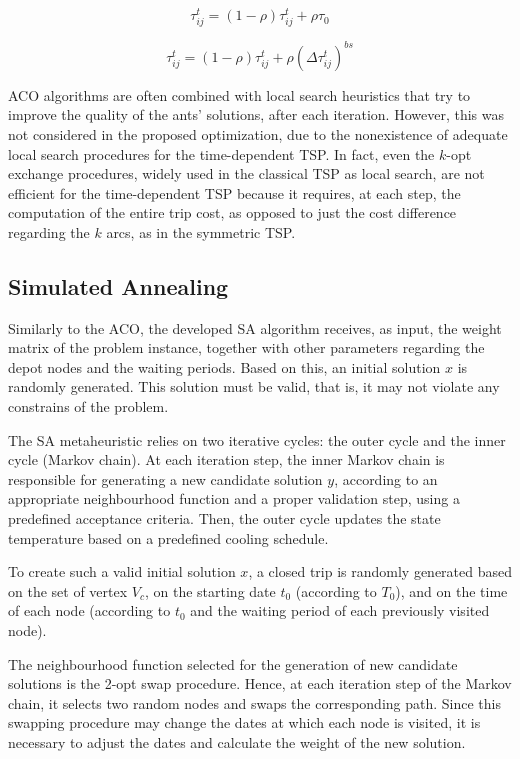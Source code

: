 \documentclass[onecolumn]{elsarticle}
\begin{document}
\begin{equation}
\label{eq:local_update}
    \tau_{ij}^{t} = (1-\rho)\tau_{ij}^{t} + \rho \tau_{0}
\end{equation}

\begin{equation}
\label{eq:pheromone_update}
    \tau_{ij}^{t} = (1-\rho)\tau_{ij}^{t} + \rho (\Delta \tau_{ij}^{t})^{bs}
\end{equation}

ACO algorithms are often combined with local search heuristics that try to improve the quality of the ants' solutions, after each iteration. However, this was not considered in the proposed optimization, due to the nonexistence of adequate local search procedures for the time-dependent TSP. In fact, even the $k$-opt exchange procedures, widely used in the classical TSP as local search, are not efficient for the time-dependent TSP because it requires, at each step, the computation of the entire trip cost, as opposed to just the cost difference regarding the $k$ arcs, as in the symmetric TSP.


\subsection{Simulated Annealing}

Similarly to the ACO, the developed SA algorithm receives, as input, the weight matrix of the problem instance, together with other parameters regarding the depot nodes and the waiting periods. Based on this, an initial solution $x$ is randomly generated. This solution must be valid, that is, it may not violate any constrains of the problem. 

The SA metaheuristic relies on two iterative cycles: the outer cycle and the inner cycle (Markov chain). At each iteration step, the inner Markov chain is responsible for generating a new candidate solution $y$, according to an appropriate neighbourhood function and a proper validation step, using a predefined acceptance criteria. Then, the outer cycle updates the state temperature based on a predefined cooling schedule.

To create such a valid initial solution $x$, a closed trip is randomly generated based on the set of vertex $V_c$, on the starting date $t_0$ (according to $T_0$), and on the time of each node (according to $t_0$ and the waiting period of each previously visited node).

The neighbourhood function selected for the generation of new candidate solutions is the 2-opt swap procedure. Hence, at each iteration step of the Markov chain, it selects two random nodes and swaps the corresponding path. Since this swapping procedure may change the dates at which each node is visited, it is necessary to adjust the dates and calculate the weight of the new solution.
\end{document}
